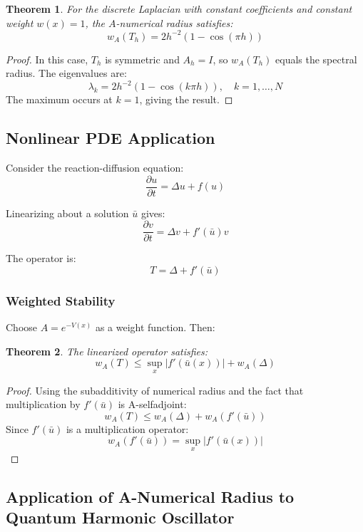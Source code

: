 \documentclass{article}
\newtheorem{theorem}{Theorem}[section]
\begin{document}
\begin{theorem}
For the discrete Laplacian with constant coefficients and constant weight $w(x) = 1$, the $A$-numerical radius satisfies:
\[ w_A(T_h) = 2h^{-2}(1 - \cos(\pi h)) \]
\end{theorem}

\begin{proof}
In this case, $T_h$ is symmetric and $A_h = I$, so $w_A(T_h)$ equals the spectral radius. The eigenvalues are:
\[ \lambda_k = 2h^{-2}(1 - \cos(k\pi h)), \quad k=1,\ldots,N \]
The maximum occurs at $k=1$, giving the result.
\end{proof}
\subsection{Nonlinear PDE Application}\hfill

Consider the reaction-diffusion equation:
\[ \frac{\partial u}{\partial t} = \Delta u + f(u) \]

Linearizing about a solution $\bar{u}$ gives:
\[ \frac{\partial v}{\partial t} = \Delta v + f'(\bar{u})v \]

The operator is:
\[ T = \Delta + f'(\bar{u}) \]

\subsubsection{Weighted Stability}

Choose $A = e^{-V(x)}$ as a weight function. Then:

\begin{theorem}
The linearized operator satisfies:
\[ w_A(T) \leq \sup_x |f'(\bar{u}(x))| + w_A(\Delta) \]
\end{theorem}

\begin{proof}
Using the subadditivity of numerical radius and the fact that multiplication by $f'(\bar{u})$ is A-selfadjoint:
\[ w_A(T) \leq w_A(\Delta) + w_A(f'(\bar{u})) \]
Since $f'(\bar{u})$ is a multiplication operator:
\[ w_A(f'(\bar{u})) = \sup_x |f'(\bar{u}(x))| \]
\end{proof}
\subsection{Application of A-Numerical Radius to Quantum Harmonic Oscillator}\hfill
\end{document}
